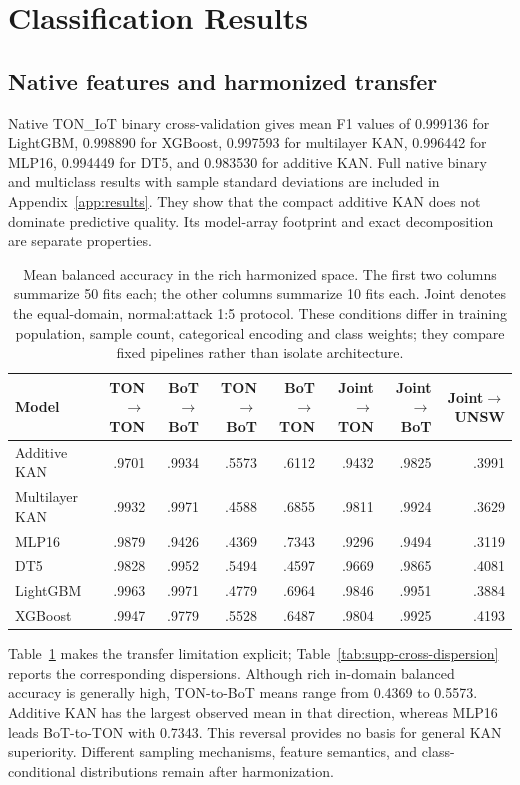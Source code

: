 \documentclass{ieeeaccess}
\begin{document}
\section{Classification Results}
\subsection{Native features and harmonized transfer}
Native TON\_IoT binary cross-validation gives mean F1 values of 0.999136 for LightGBM, 0.998890 for XGBoost, 0.997593 for multilayer KAN, 0.996442 for MLP16, 0.994449 for DT5, and 0.983530 for additive KAN. Full native binary and multiclass results with sample standard deviations are included in Appendix~\ref{app:results}. They show that the compact additive KAN does not dominate predictive quality. Its model-array footprint and exact decomposition are separate properties.

\begin{table}[t]
\caption{Mean balanced accuracy in the rich harmonized space. The first two columns summarize 50 fits each; the other columns summarize 10 fits each. Joint denotes the equal-domain, normal:attack 1:5 protocol. These conditions differ in training population, sample count, categorical encoding and class weights; they compare fixed pipelines rather than isolate architecture.}
\label{tab:cross}
\centering\small
\begin{tabular}{lrrrrrrr}
\toprule
Model & TON$\to$TON & BoT$\to$BoT & TON$\to$BoT & BoT$\to$TON & Joint$\to$TON & Joint$\to$BoT & Joint$\to$UNSW\\
\midrule
Additive KAN & .9701 & .9934 & .5573 & .6112 & .9432 & .9825 & .3991\\
Multilayer KAN & .9932 & .9971 & .4588 & .6855 & .9811 & .9924 & .3629\\
MLP16 & .9879 & .9426 & .4369 & .7343 & .9296 & .9494 & .3119\\
DT5 & .9828 & .9952 & .5494 & .4597 & .9669 & .9865 & .4081\\
LightGBM & .9963 & .9971 & .4779 & .6964 & .9846 & .9951 & .3884\\
XGBoost & .9947 & .9779 & .5528 & .6487 & .9804 & .9925 & .4193\\
\bottomrule
\end{tabular}
\end{table}



Table~\ref{tab:cross} makes the transfer limitation explicit; Table~\ref{tab:supp-cross-dispersion} reports the corresponding dispersions. Although rich in-domain balanced accuracy is generally high, TON-to-BoT means range from 0.4369 to 0.5573. Additive KAN has the largest observed mean in that direction, whereas MLP16 leads BoT-to-TON with 0.7343. This reversal provides no basis for general KAN superiority. Different sampling mechanisms, feature semantics, and class-conditional distributions remain after harmonization.
\end{document}
